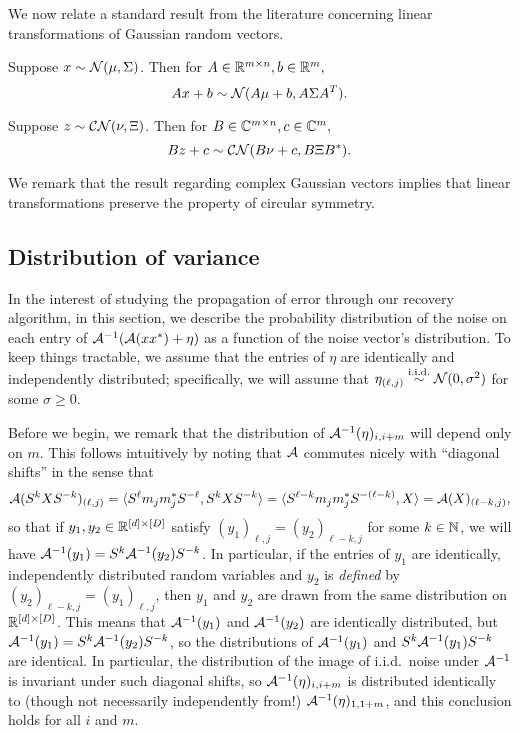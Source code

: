 We now relate a standard result from the literature concerning linear transformations of Gaussian random vectors.
\begin{proposition} \label{prop:gausaff}
  Suppose $x \sim \mathcal{N}(\mu, \Sigma)$.  Then for $A \in \mathbb{R}^{m \times n}, b \in \mathbb{R}^m,$ \begin{equation} Ax + b \sim \mathcal{N}(A \mu + b, A \Sigma A^T). \label{eq:real_gausaff} \end{equation}

  Suppose $z \sim \mathcal{C N}(\nu, \Xi)$.  Then for $B \in \mathbb{C}^{m \times n}, c \in \mathbb{C}^m,$ \begin{equation} B z + c \sim \mathcal{C N}(B \nu + c, B \Xi B^*). \label{eq:cpx_gausaff}\end{equation}
\end{proposition}
We remark that the result regarding complex Gaussian vectors implies that linear transformations preserve the property of circular symmetry.

\subsection{Distribution of variance}
\label{sec:dist_var}
In the interest of studying the propagation of error through our recovery algorithm, in this section, we describe the probability distribution of the noise on each entry of $\mathcal{A}^{-1}(\mathcal{A}(x x^*) + \eta)$ as a function of the noise vector's distribution.  To keep things tractable, we assume that the entries of $\eta$ are identically and independently distributed; specifically, we will assume that $\eta_{(\ell, j)} \overset{\text{i.i.d.}}{\sim} \mathcal{N}(0, \sigma^2)$ for some $\sigma \ge 0$.

Before we begin, we remark that the distribution of $\mathcal{A}^{-1}(\eta)_{i, i + m}$ will depend only on $m$.  This follows intuitively by noting that $\mathcal{A}$ commutes nicely with ``diagonal shifts'' in the sense that \[\mathcal{A}(S^k X S^{-k})_{(\ell, j)} = \langle S^{\ell} m_j m_j^* S^{-\ell}, S^k X S^{-k}\rangle = \langle S^{\ell - k} m_j m_j^* S^{-(\ell - k)}, X\rangle = \mathcal{A}(X)_{(\ell - k, j)},\] so that if $y_1, y_2 \in \mathbb{R}^{[d] \times [D]}$ satisfy $(y_1)_{\ell, j} = (y_2)_{\ell - k, j}$ for some $k \in \mathbb{N}$, we will have $\mathcal{A}^{-1}(y_1) = S^k \mathcal{A}^{-1}(y_2) S^{-k}$.  In particular, if the entries of $y_1$ are identically, independently distributed random variables and $y_2$ is \emph{defined} by $(y_2)_{\ell - k, j} = (y_1)_{\ell, j}$, then $y_1$ and $y_2$ are drawn from the same distribution on $\mathbb{R}^{[d] \times [D]}$.  This means that $\mathcal{A}^{-1}(y_1)$ and $\mathcal{A}^{-1}(y_2)$ are identically distributed, but $\mathcal{A}^{-1}(y_1) = S^k \mathcal{A}^{-1}(y_2) S^{-k}$, so the distributions of $\mathcal{A}^{-1}(y_1)$ and $S^k \mathcal{A}^{-1}(y_1) S^{-k}$ are identical.  In particular, the distribution of the image of i.i.d.~noise under $\mathcal{A}^{-1}$ is invariant under such diagonal shifts, so $\mathcal{A}^{-1}(\eta)_{i, i + m}$ is distributed identically to (though not necessarily independently from!) $\mathcal{A}^{-1}(\eta)_{1, 1 + m}$, and this conclusion holds for all $i$ and $m$.

